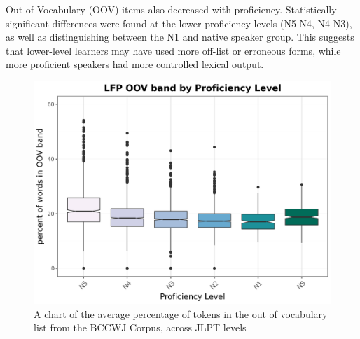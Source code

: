 Out-of-Vocabulary (OOV) items also decreased with proficiency. Statistically significant
differences were found at the lower
 proficiency levels (N5-N4,
N4-N3), as well as distinguishing between the N1 and native speaker group. This
suggests that lower-level learners
may
have used more off-list or erroneous forms, while more proficient speakers
had more controlled lexical output.
\begin{figure}
    \centering
    \includegraphics[scale=.4]{img/LFP/OOV}
    \caption[Percentage of tokens in the Out of Vocabulary list (OOV)]{A chart of the average percentage of tokens in the out of vocabulary list from the BCCWJ Corpus, across JLPT levels}
    \label{fig:LFPOOV}
\end{figure}





